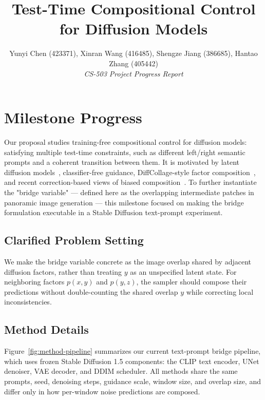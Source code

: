 \documentclass[10pt,conference,compsocconf]{IEEEtran}
\begin{document}
\title{Test-Time Compositional Control for Diffusion Models}

\author{
  Yunyi Chen (423371), Xinran Wang (416485), Shengze Jiang (386685), Hantao Zhang (405442)\\
  \textit{CS-503 Project Progress Report}
}

\maketitle

\section{Milestone Progress}

Our proposal studies training-free compositional control for diffusion models: satisfying multiple test-time constraints, such as different left/right semantic prompts and a coherent transition between them.
It is motivated by latent diffusion models~\cite{rombach2022high}, classifier-free guidance, DiffCollage-style factor composition~\cite{zhang2023diffcollage}, and recent correction-based views of biased composition~\cite{skreta2024superposition,skreta2025fkc}. To further instantiate the "bridge variable" — defined here as the overlapping intermediate patches in panoramic image generation — this milestone focused on making the bridge formulation executable in a Stable Diffusion text-prompt experiment.



\subsection{Clarified Problem Setting}

We make the bridge variable concrete as the image overlap shared by adjacent diffusion factors, rather than treating $y$ as an unspecified latent state.
For neighboring factors $p(x,y)$ and $p(y,z)$, the sampler should compose their predictions without double-counting the shared overlap $y$ while correcting local inconsistencies.

\subsection{Method Details}

Figure~\ref{fig:method-pipeline} summarizes our current text-prompt bridge pipeline, which uses frozen Stable Diffusion 1.5 components: the CLIP text encoder, UNet denoiser, VAE decoder, and DDIM scheduler.
All methods share the same prompts, seed, denoising steps, guidance scale, window size, and overlap size, and differ only in how per-window noise predictions are composed.
\end{document}
